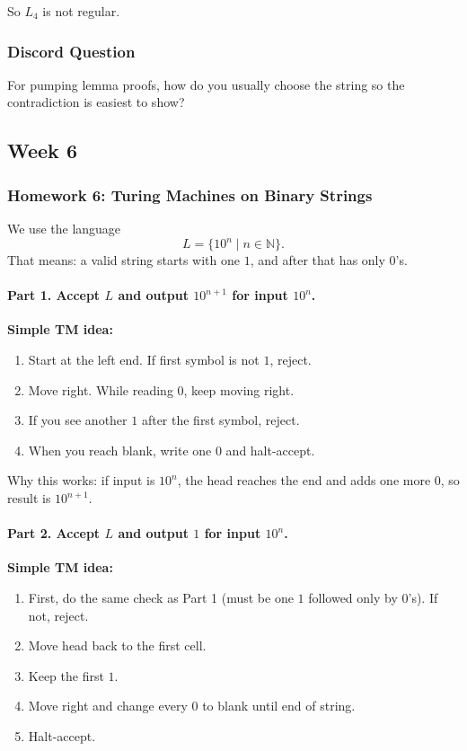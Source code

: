\documentclass{article}
\theoremstyle{theorem}
\theoremstyle{definition}
\theoremstyle{remark}
\begin{document}
So $L_4$ is not regular.

\subsubsection{Discord Question}

For pumping lemma proofs, how do you usually choose the string so the contradiction is easiest to show?

\subsection{Week 6}

\subsubsection{Homework 6: Turing Machines on Binary Strings}

We use the language
\[
L=\{10^n \mid n\in\mathbb{N}\}.
\]
That means: a valid string starts with one $1$, and after that has only $0$'s.

\paragraph{Part 1. Accept $L$ and output $10^{n+1}$ for input $10^n$.}
\textbf{Simple TM idea:}
\begin{enumerate}
  \item Start at the left end. If first symbol is not $1$, reject.
  \item Move right. While reading $0$, keep moving right.
  \item If you see another $1$ after the first symbol, reject.
  \item When you reach blank, write one $0$ and halt-accept.
\end{enumerate}

Why this works: if input is $10^n$, the head reaches the end and adds one more $0$, so result is $10^{n+1}$.

\paragraph{Part 2. Accept $L$ and output $1$ for input $10^n$.}
\textbf{Simple TM idea:}
\begin{enumerate}
  \item First, do the same check as Part 1 (must be one $1$ followed only by $0$'s). If not, reject.
  \item Move head back to the first cell.
  \item Keep the first $1$.
  \item Move right and change every $0$ to blank until end of string.
  \item Halt-accept.
\end{enumerate}
\end{document}
